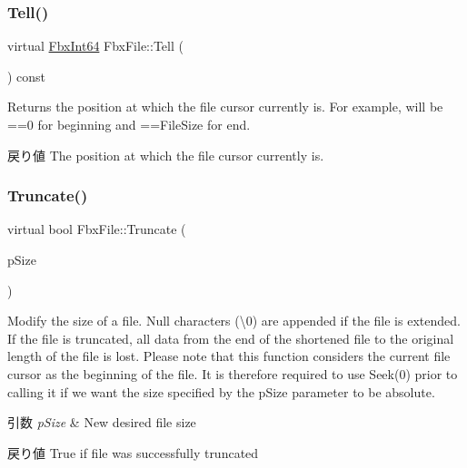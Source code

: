 \subsubsection{\texorpdfstring{Tell()}{Tell()}}
{\footnotesize\ttfamily virtual \hyperlink{fbxtypes_8h_ac7e1334c7c6aacc9c8a9dccddebb4368}{Fbx\+Int64} Fbx\+File\+::\+Tell (\begin{DoxyParamCaption}{ }\end{DoxyParamCaption}) const\hspace{0.3cm}{\ttfamily [virtual]}}

Returns the position at which the file cursor currently is. For example, will be ==0 for beginning and ==File\+Size for end. \begin{DoxyReturn}{戻り値}
The position at which the file cursor currently is. 
\end{DoxyReturn}
\mbox{\label{class_fbx_file_aa93638b789020857a19306175a921271}} 
\subsubsection{\texorpdfstring{Truncate()}{Truncate()}}
{\footnotesize\ttfamily virtual bool Fbx\+File\+::\+Truncate (\begin{DoxyParamCaption}\item[{const \hyperlink{fbxtypes_8h_ac7e1334c7c6aacc9c8a9dccddebb4368}{Fbx\+Int64}}]{p\+Size }\end{DoxyParamCaption})\hspace{0.3cm}{\ttfamily [virtual]}}

Modify the size of a file. Null characters (\textquotesingle{}\textbackslash{}0\textquotesingle{}) are appended if the file is extended. If the file is truncated, all data from the end of the shortened file to the original length of the file is lost. Please note that this function considers the current file cursor as the beginning of the file. It is therefore required to use Seek(0) prior to calling it if we want the size specified by the p\+Size parameter to be absolute. 
\begin{DoxyParams}{引数}
{\em p\+Size} & New desired file size \\
\hline
\end{DoxyParams}
\begin{DoxyReturn}{戻り値}
True if file was successfully truncated 
\end{DoxyReturn}
\mbox{\label{class_fbx_file_a8fff74d83402e939b69ac4c25a5bc689}} 
